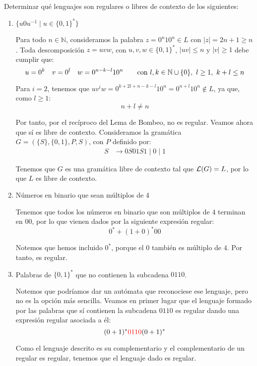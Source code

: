 \begin{ejercicio}\label{ej:1.3.2}
    Determinar qué lenguajes son regulares o libres de contexto de los siguientes:
    \begin{enumerate}
        \item $\{u0u^{-1}\mid u \in {\{0,1\}}^\ast\}$
        
        Para todo $n\in \mathbb{N}$, consideramos la palabra $z=0^{n}10^n\in L$ con $|z|=2n+1\geq n$. Toda descomposición $z=uvw$, con $u,v,w\in \{0,1\}^\ast$, $|uv|\leq n$ y $|v|\geq 1$ debe cumplir que:
        \begin{equation*}
            u=0^k \quad v=0^l \quad w=0^{n-k-l}10^n \qquad \text{con } l,k\in \mathbb{N}\cup \{0\},~l\geq 1,~k+l\leq n
        \end{equation*}

        Para $i=2$, tenemos que $uv^iw=0^{k+2l+n-k-l}10^n=0^{n+l}10^n\notin L$, ya que, como $l\geq 1$:
        \begin{equation*}
            n+l\neq n
        \end{equation*}

        Por tanto, por el recíproco del Lema de Bombeo, no es regular. Veamos ahora que sí es libre de contexto. Consideramos la gramática $G=(\{S\},\{0,1\},P,S)$, con $P$ definido por:
        \begin{align*}
            S &\rightarrow 0S0 1S1 \mid 0 \mid 1
        \end{align*}

        Tenemos que $G$ es una gramática libre de contexto tal que $\mathcal{L}(G)=L$, por lo que $L$ es libre de contexto.

        \item Números en binario que sean múltiplos de 4
        
        Tenemos que todos los números en binario que son múltiplos de 4 terminan en $00$, por lo que vienen dados por la siguiente expresión regular:
        \begin{equation*}
            0^* + (1+0)^{\ast}00
        \end{equation*}

        Notemos que hemos incluido $0^*$, porque el $0$ también es múltiplo de $4$. Por tanto, es regular.

        \item Palabras de ${\{0,1\}}^\ast$ que no contienen la subcadena $0110$.
        
        Notemos que podríamos dar un autómata que reconociese ese lenguaje, pero no es la opción más sencilla.
        Veamos en primer lugar que el lenguaje formado por las palabras que sí contienen la subcadena $0110$ es regular dando una expresión regular asociada a él:
        \begin{equation*}
            (0+1)^*{\color{red}0110}(0+1)^*
        \end{equation*}

        Como el lenguaje descrito es su complementario y el complementario de un regular es regular, tenemos que el lenguaje dado es regular.
    \end{enumerate}
\end{ejercicio}


